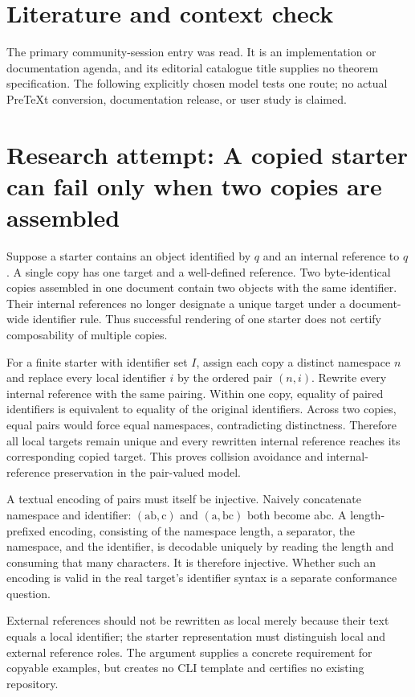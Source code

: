 \documentclass[11pt]{article}
\begin{document}
\section{Literature and context check}
The primary community-session entry was read. It is an implementation or documentation agenda, and its editorial catalogue title supplies no theorem specification. The following explicitly chosen model tests one route; no actual PreTeXt conversion, documentation release, or user study is claimed.
\section{Research attempt: A copied starter can fail only when two copies are assembled}
Suppose a starter contains an object identified by $q$ and an internal reference to $q$. A single copy has one target and a well-defined reference. Two byte-identical copies assembled in one document contain two objects with the same identifier. Their internal references no longer designate a unique target under a document-wide identifier rule. Thus successful rendering of one starter does not certify composability of multiple copies.

For a finite starter with identifier set $I$, assign each copy a distinct namespace $n$ and replace every local identifier $i$ by the ordered pair $(n,i)$. Rewrite every internal reference with the same pairing. Within one copy, equality of paired identifiers is equivalent to equality of the original identifiers. Across two copies, equal pairs would force equal namespaces, contradicting distinctness. Therefore all local targets remain unique and every rewritten internal reference reaches its corresponding copied target. This proves collision avoidance and internal-reference preservation in the pair-valued model.

A textual encoding of pairs must itself be injective. Naively concatenate namespace and identifier: $(\text{ab},\text{c})$ and $(\text{a},\text{bc})$ both become abc. A length-prefixed encoding, consisting of the namespace length, a separator, the namespace, and the identifier, is decodable uniquely by reading the length and consuming that many characters. It is therefore injective. Whether such an encoding is valid in the real target's identifier syntax is a separate conformance question.

External references should not be rewritten as local merely because their text equals a local identifier; the starter representation must distinguish local and external reference roles. The argument supplies a concrete requirement for copyable examples, but creates no CLI template and certifies no existing repository.
\end{document}
